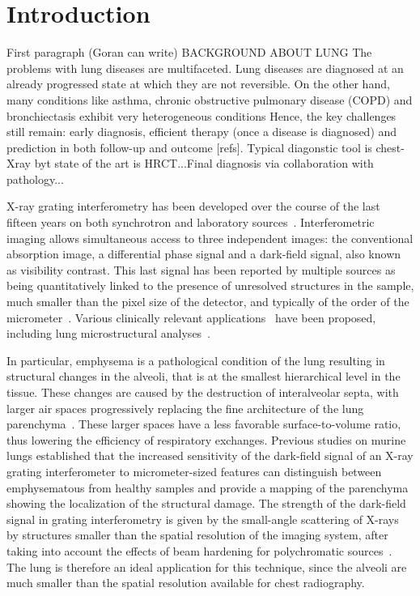 \documentclass[preprint,12pt]{elsarticle}
\begin{document}
\section*{Introduction}\label{sec:introduction}
First paragraph (Goran can write) BACKGROUND ABOUT LUNG
The problems with lung diseases are multifaceted. Lung diseases are diagnosed at an already progressed state at which they are not reversible. On the other hand, many conditions like asthma, chronic obstructive pulmonary disease (COPD) and bronchiectasis exhibit very heterogeneous conditions Hence, the key challenges still remain: early diagnosis, efficient therapy (once a disease is diagnosed) and prediction in both follow-up and outcome [refs]. Typical diagonstic tool is chest-Xray byt state of the art is HRCT...Final diagnosis via collaboration with pathology...

X-ray grating interferometry has been developed over the course of the last
  fifteen years on both synchrotron and laboratory
sources~\cite{David_2002,1347-4065-42-7B-L866,Weitkamp_2005,1347-4065-45-6R-5254,Pfeiffer2006}. Interferometric
imaging allows simultaneous access to three independent images: the
conventional absorption image, a differential phase signal and a dark-field
signal, also known as visibility contrast. This last signal has been
reported by multiple sources as being quantitatively linked to the presence
of unresolved structures in the sample, much smaller than the pixel size of
the detector, and typically of the order of the
micrometer~\cite{Pfeiffer2008,Lynch:11,Yashiro:10}.
Various clinically relevant
applications~\cite{Wen_2009,Thilo2013} have been
proposed, including lung microstructural analyses~\cite{Schleede17880,Meinel_2014,Meinel_2013,Yaroshenko_2013,Modregger2016}.

In particular, emphysema is a pathological condition of the lung
resulting in structural changes in the alveoli, that is at the smallest
hierarchical level in the tissue. These changes are caused by the
destruction of interalveolar septa, with larger air spaces progressively
replacing the fine architecture of the lung parenchyma~\cite{Sharafkhaneh_2008}. These larger spaces
have a less favorable surface-to-volume ratio, thus lowering the efficiency
of respiratory exchanges. Previous studies on murine lungs established that the increased sensitivity of
the dark-field signal of an X-ray grating interferometer to micrometer-sized
features can distinguish between emphysematous from healthy samples and
provide a mapping of the parenchyma showing the localization of the
structural damage. The strength of the dark-field signal in grating interferometry is
given by the small-angle scattering of X-rays by structures smaller than the
spatial resolution of the imaging system, after taking into account the effects of beam hardening for polychromatic sources~\cite{Koenig2016}. The lung is therefore an ideal
application for this technique, since the alveoli are much
smaller than the spatial resolution available for chest radiography.
\end{document}
